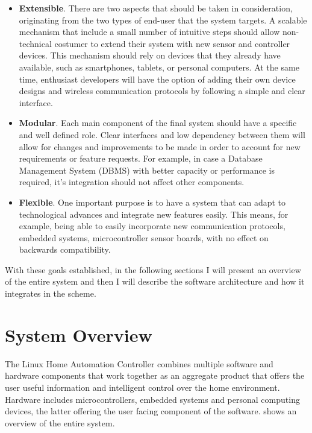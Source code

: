 \begin{itemize}

\item \textbf{Extensible}. There are two aspects that should be taken in consideration, originating from the two types of end-user that the system targets. A scalable mechanism that include a small number of intuitive steps should allow non-technical costumer to extend their system with new sensor and controller devices. This mechanism should rely on devices that they already have available, such as smartphones, tablets, or personal computers. At the same time, enthusiast developers will have the option of adding their own device designs and wireless communication protocols by following a simple and clear interface.

\item \textbf{Modular}. Each main component of the final system should have a specific and well defined role. Clear interfaces and low dependency between them will allow for changes and improvements to be made in order to account for new requirements or feature requests. For example, in case a Database Management System (DBMS) with better capacity or performance is required, it's integration should not affect other components.

\item \textbf{Flexible}. One important purpose is to have a system that can adapt to technological advances and integrate new features easily. This means, for example, being able to easily incorporate new communication protocols, embedded systems, microcontroller sensor boards, with no effect on backwards compatibility.

\end{itemize}

With these goals established, in the following sections I will present an overview of the entire system and then I will describe the software architecture and how it integrates in the scheme.

\section{System Overview}

The Linux Home Automation Controller combines multiple software and hardware components that work together as an aggregate product that offers the user useful information and intelligent control over the home environment. Hardware includes microcontrollers, embedded systems and personal computing devices, the latter offering the user facing component of the software.  shows an overview of the entire system.

